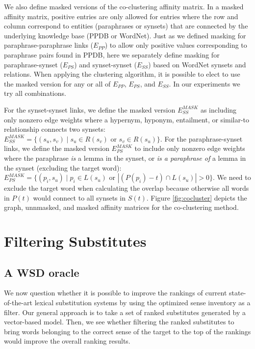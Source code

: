 \documentclass[11pt]{article}
\begin{document}
We also define masked versions of the co-clustering affinity matrix. In a masked affinity matrix, positive entries are only allowed for entries where the row and column correspond to entities (paraphrases or synsets) that are connected by the underlying knowledge base (PPDB or WordNet). Just as we defined masking for paraphrase-paraphrase links ($E_{PP}$) to allow only positive values corresponding to paraphrase pairs found in PPDB, here we separately define masking for paraphrase-synset ($E_{PS}$) and synset-synset ($E_{SS}$) based on WordNet synsets and relations. When applying the clustering algorithm, it is possible to elect to use the masked version for any or all of $E_{PP}$, $E_{PS}$, and $E_{SS}$. In our experiments we try all combinations.

For the synset-synset links, we define the masked version $E_{SS}^{MASK}$ as including only nonzero edge weights where a hypernym, hyponym, entailment, or similar-to relationship connects two synsets: $E_{SS}^{MASK} = \{(s_u, s_v) \mid s_u \in R(s_v) \text{ or } s_v \in R(s_u)\}$. For the paraphrase-synset links, we define the masked version $E_{PS}^{MASK}$ to include only nonzero edge weights where the paraphrase \textit{is} a lemma in the synset, or \textit{is a paraphrase of} a lemma in the synset (excluding the target word): $E_{PS}^{MASK} = \{(p_i, s_u) \mid p_i \in L(s_u) \text{ or } |(P(p_i)-t) \cap L(s_u)| > 0 \}$. We need to exclude the target word when calculating the overlap because otherwise all words in $P(t)$ would connect to all synsets in $S(t)$. Figure \ref{fig:cocluster} depicts the graph, unnmasked, and masked affinity matrices for the co-clustering method. 


\section{Filtering Substitutes}

\subsection{A WSD oracle}

We now question whether it is possible to improve the rankings of current state-of-the-art lexical substitution systems by using the optimized sense inventory as a filter. Our general approach is to take a set of ranked substitutes generated by a vector-based model. Then, we see whether filtering the ranked substitutes to bring words belonging to the correct sense of the target to the top of the rankings would improve the overall ranking results. 
\end{document}
